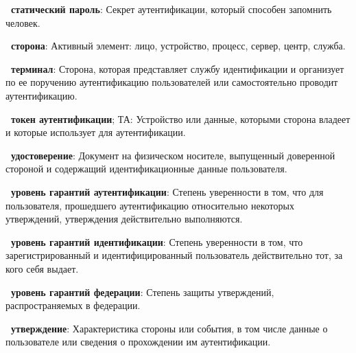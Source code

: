 
{\bf \thedefctr~статический пароль}:
Секрет аутентификации, который способен запомнить человек.

{\bf \thedefctr~сторона}:
Активный элемент: лицо, устройство, процесс, сервер, центр, служба.

{\bf \thedefctr~терминал}:
Сторона, которая представляет службу идентификации и организует по ее поручению
аутентификацию пользователей или самостоятельно проводит аутентификацию.

{\bf \thedefctr~токен аутентификации}; ТА:
Устройство или данные, которыми сторона владеет и которые использует для
аутентификации.

{\bf \thedefctr~удостоверение}:
Документ на физическом носителе, выпущенный доверенной стороной и содержащий
идентификационные данные пользователя.


{\bf \thedefctr~уровень гарантий аутентификации}:
Степень уверенности в том, что для пользователя, прошедшего аутентификацию
относительно некоторых утверждений, утверждения действительно выполняются.


{\bf \thedefctr~уровень гарантий идентификации}:
Степень уверенности в том, что зарегистрированный и идентифицированный
пользователь действительно тот, за кого себя выдает.


{\bf \thedefctr~уровень гарантий федерации}:
Степень защиты утверждений, распространяемых в федерации.



{\bf \thedefctr~утверждение}:
Характеристика стороны или события, в том числе данные о пользователе или
сведения о прохождении им аутентификации.

